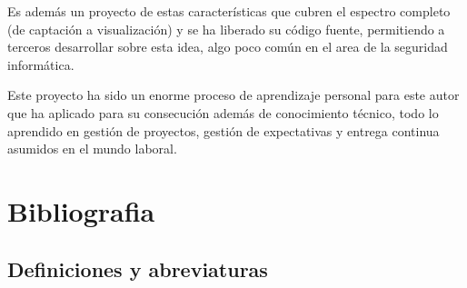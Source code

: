 Es además un proyecto de estas características que cubren el espectro completo (de captación a visualización) y se ha liberado su código fuente, permitiendo a terceros desarrollar sobre esta idea, algo
poco común en el area de la seguridad informática. 

Este proyecto ha sido un enorme proceso de aprendizaje personal para este autor que ha aplicado para su consecución además de conocimiento técnico, todo lo aprendido
en gestión de proyectos, gestión de expectativas y entrega continua asumidos en el mundo laboral.

\chapter{Bibliografia}

\nocite{*}
\nopagebreak
\printbibheading[title={Bibliografia},heading=none]
\printbibliography[title={Referencias},heading=none]
\nopagebreak

\section*{Definiciones y abreviaturas}

